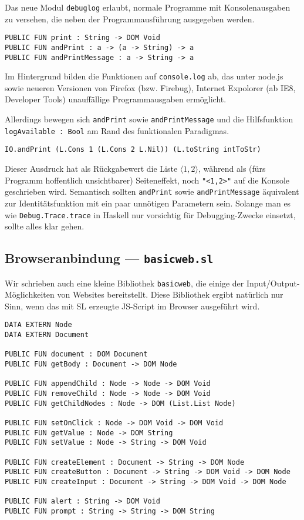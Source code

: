 \documentclass[runningheads]{llncs}
\begin{document}
Das neue Modul \verb|debuglog| erlaubt, normale Programme mit Konsolenausgaben
zu versehen, die neben der Programmausführung ausgegeben werden.

\begin{verbatim}
PUBLIC FUN print : String -> DOM Void
PUBLIC FUN andPrint : a -> (a -> String) -> a
PUBLIC FUN andPrintMessage : a -> String -> a
\end{verbatim}

Im Hintergrund bilden die Funktionen auf \verb|console.log| ab, das unter
node.js sowie neueren Versionen von Firefox (bzw. Firebug), Internet Expolorer
(ab IE8, Developer Tools) unauffällige Programmausgaben ermöglicht.

Allerdings bewegen sich \verb|andPrint| sowie \verb|andPrintMessage| und die
Hilfsfunktion \verb|logAvailable : Bool| am Rand des funktionalen Paradigmas.

\begin{verbatim}
IO.andPrint (L.Cons 1 (L.Cons 2 L.Nil)) (L.toString intToStr)
\end{verbatim}

Dieser Ausdruck hat als Rückgabewert die Liste $\langle1,2\rangle$,
während als (fürs Programm hoffentlich unsichtbarer) Seiteneffekt,
noch \verb|"<1,2>"| auf die Konsole geschrieben wird. Semantisch sollten
\verb|andPrint| sowie \verb|andPrintMessage| äquivalent zur Identitätsfunktion
mit ein paar unnötigen Parametern sein. Solange man es wie
\verb|Debug.Trace.trace| in Haskell nur vorsichtig für Debugging-Zwecke
einsetzt, sollte alles klar gehen.

\subsection{Browseranbindung --- \texttt{basicweb.sl}}

Wir schrieben auch eine kleine Bibliothek \verb|basicweb|, die einige der
Input/Output-Möglichkeiten von Websites bereitstellt. Diese Bibliothek ergibt
natürlich nur Sinn, wenn das mit SL erzeugte JS-Script im Browser ausgeführt
wird.

\begin{verbatim}
DATA EXTERN Node
DATA EXTERN Document

PUBLIC FUN document : DOM Document
PUBLIC FUN getBody : Document -> DOM Node

PUBLIC FUN appendChild : Node -> Node -> DOM Void
PUBLIC FUN removeChild : Node -> Node -> DOM Void
PUBLIC FUN getChildNodes : Node -> DOM (List.List Node)

PUBLIC FUN setOnClick : Node -> DOM Void -> DOM Void
PUBLIC FUN getValue : Node -> DOM String
PUBLIC FUN setValue : Node -> String -> DOM Void

PUBLIC FUN createElement : Document -> String -> DOM Node
PUBLIC FUN createButton : Document -> String -> DOM Void -> DOM Node
PUBLIC FUN createInput : Document -> String -> DOM Void -> DOM Node

PUBLIC FUN alert : String -> DOM Void
PUBLIC FUN prompt : String -> String -> DOM String 
\end{verbatim}
\end{document}
